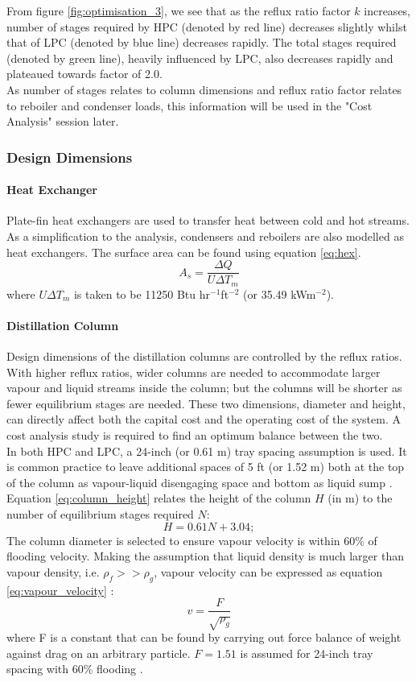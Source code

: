 \documentclass[11pt,oneside]{article}
\let\subsubsubsection\paragraph
\begin{document}
	\noindent From figure \ref{fig:optimisation_3}, we see that as the reflux ratio factor $k$ increases, number of stages required by HPC (denoted by red line) decreases slightly whilst that of LPC (denoted by blue line) decreases rapidly. The total stages required (denoted by green line), heavily influenced by LPC, also decreases rapidly and plateaued towards factor of 2.0. \\
	As number of stages relates to column dimensions and reflux ratio factor relates to reboiler and condenser loads, this information will be used in the "Cost Analysis" session later.
    \subsubsection{Design Dimensions} \noindent
		\subsubsubsection{Heat Exchanger}
		Plate-fin heat exchangers are used to transfer heat between cold and hot streams. As a simplification to the analysis, condensers and reboilers are also modelled as heat exchangers. The surface area can be found using equation \ref{eq:hex}.
		\begin{equation}
		    A_s = \frac{\Delta Q}{U\Delta T_m}
		    \label{eq:hex}
		\end{equation} 
		where $U\Delta T_m$ is taken to be 11250 Btu hr$^{-1}$ft$^{-2}$ (or 35.49 kWm$^{-2}$).
		
		\subsubsubsection{Distillation Column}
		Design dimensions of the distillation columns are controlled by the reflux ratios. With higher reflux ratios, wider columns are needed to accommodate larger vapour and liquid streams inside the column; but the columns will be shorter as fewer equilibrium stages are needed. These two dimensions, diameter and height, can directly affect both the capital cost and the operating cost of the system. A cost analysis study is required to find an optimum balance between the two. \\
		
		\noindent In both HPC and LPC, a 24-inch (or 0.61 m) tray spacing assumption is used. It is common practice to leave additional spaces of 5 ft (or 1.52 m) both at the top of the column as vapour-liquid disengaging space and bottom as liquid sump \citep{douglas1988}. Equation \ref{eq:column_height} relates the height of the column $H$ (in m) to the number of equilibrium stages required $N$:
		\begin{equation}
		    H = 0.61N + 3.04;
		    \label{eq:column_height}
		\end{equation}
		The column diameter is selected to ensure vapour velocity is within 60\% of flooding velocity. Making the assumption that liquid density is much larger than vapour density, i.e. $\rho_f >> \rho_g$, vapour velocity can be expressed as equation \ref{eq:vapour_velocity} \citep{douglas1988}:
		\begin{equation}
		    v = \frac{F}{\sqrt{\rho_g}}
		    \label{eq:vapour_velocity}
		\end{equation}
		where F is a constant that can be found by carrying out force balance of weight against drag on an arbitrary particle. $F = 1.51$ is assumed for 24-inch tray spacing with 60\% flooding \citep{perry2007}. \\
		
\end{document}
